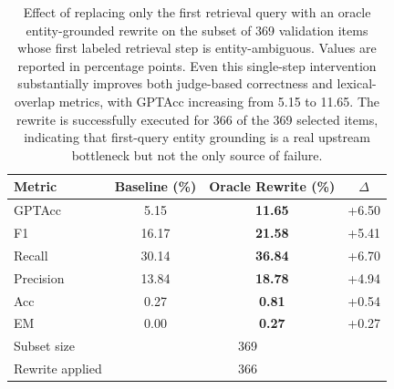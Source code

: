 \begin{table}[t]
\centering
\small
\setlength{\tabcolsep}{7pt}
\caption{Effect of replacing only the first retrieval query with an oracle entity-grounded rewrite on the subset of 369 validation items whose first labeled retrieval step is entity-ambiguous. Values are reported in percentage points. Even this single-step intervention substantially improves both judge-based correctness and lexical-overlap metrics, with GPTAcc increasing from 5.15 to 11.65. The rewrite is successfully executed for 366 of the 369 selected items, indicating that first-query entity grounding is a real upstream bottleneck but not the only source of failure.}
\label{tab:first-round-oracle-rewrite}
\begin{tabular}{lccc}
\toprule
Metric & Baseline (\%) & Oracle Rewrite (\%) & $\Delta$ \\
\midrule
GPTAcc & 5.15 & \textbf{11.65} & +6.50 \\
F1 & 16.17 & \textbf{21.58} & +5.41 \\
Recall & 30.14 & \textbf{36.84} & +6.70 \\
Precision & 13.84 & \textbf{18.78} & +4.94 \\
Acc & 0.27 & \textbf{0.81} & +0.54 \\
EM & 0.00 & \textbf{0.27} & +0.27 \\
\midrule
Subset size & \multicolumn{3}{c}{369} \\
Rewrite applied & \multicolumn{3}{c}{366} \\
\bottomrule
\end{tabular}
\end{table}
